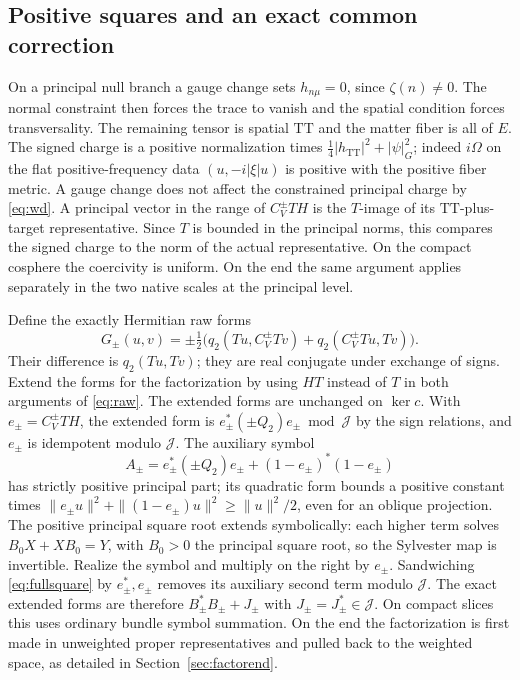 \documentclass[11pt]{article}
\newcommand{\TT}{\mathrm{TT}}
\newcommand{\Reg}{\mathcal J}
\begin{document}
\subsection{Positive squares and an exact common correction}\label{sec:square}

On a principal null branch a gauge change sets \(h_{n\mu}=0\), since \(\zeta(n)\ne0\). The normal constraint then forces the trace to vanish and the spatial condition forces transversality. The remaining tensor is spatial \(\TT\) and the matter fiber is all of \(E\). The signed charge is a positive normalization times \(\tfrac14|h_{\TT}|^2+|\psi|_G^2\); indeed \(i\Omega\) on the flat positive-frequency data \((u,-i|\xi|u)\) is positive with the positive fiber metric. A gauge change does not affect the constrained principal charge by \eqref{eq:wd}. A principal vector in the range of \(C_V^\pm TH\) is the \(T\)-image of its \(\TT\)-plus-target representative. Since \(T\) is bounded in the principal norms, this compares the signed charge to the norm of the actual representative. On the compact cosphere the coercivity is uniform. On the end the same argument applies separately in the two native scales at the principal level.

Define the exactly Hermitian raw forms
\begin{equation}
 G_\pm(u,v)=\pm\tfrac12
 \bigl(q_2(Tu,C_V^\pm Tv)+q_2(C_V^\pm Tu,Tv)\bigr).
 \label{eq:raw}
\end{equation}
Their difference is \(q_2(Tu,Tv)\); they are real conjugate under exchange of signs. Extend the forms for the factorization by using \(HT\) instead of \(T\) in both arguments of \eqref{eq:raw}. The extended forms are unchanged on \(\ker c\). With \(e_\pm=C_V^\pm TH\), the extended form is \(e_\pm^*(\pm Q_2)e_\pm\bmod\Reg\) by the sign relations, and \(e_\pm\) is idempotent modulo \(\Reg\). The auxiliary symbol
\begin{equation}
 A_\pm=e_\pm^*(\pm Q_2)e_\pm+(1-e_\pm)^*(1-e_\pm)
 \label{eq:fullsquare}
\end{equation}
has strictly positive principal part; its quadratic form bounds a positive constant times
\(\|e_\pm u\|^2+\|(1-e_\pm)u\|^2\geq\|u\|^2/2\), even for an oblique projection. The positive principal square root extends symbolically: each higher term solves \(B_0X+XB_0=Y\), with \(B_0>0\) the principal square root, so the Sylvester map is invertible. Realize the symbol and multiply on the right by \(e_\pm\). Sandwiching \eqref{eq:fullsquare} by \(e_\pm^*,e_\pm\) removes its auxiliary second term modulo \(\Reg\). The exact extended forms are therefore \(B_\pm^*B_\pm+J_\pm\) with \(J_\pm=J_\pm^*\in\Reg\). On compact slices this uses ordinary bundle symbol summation. On the end the factorization is first made in unweighted proper representatives and pulled back to the weighted space, as detailed in Section~\ref{sec:factorend}.
\end{document}
